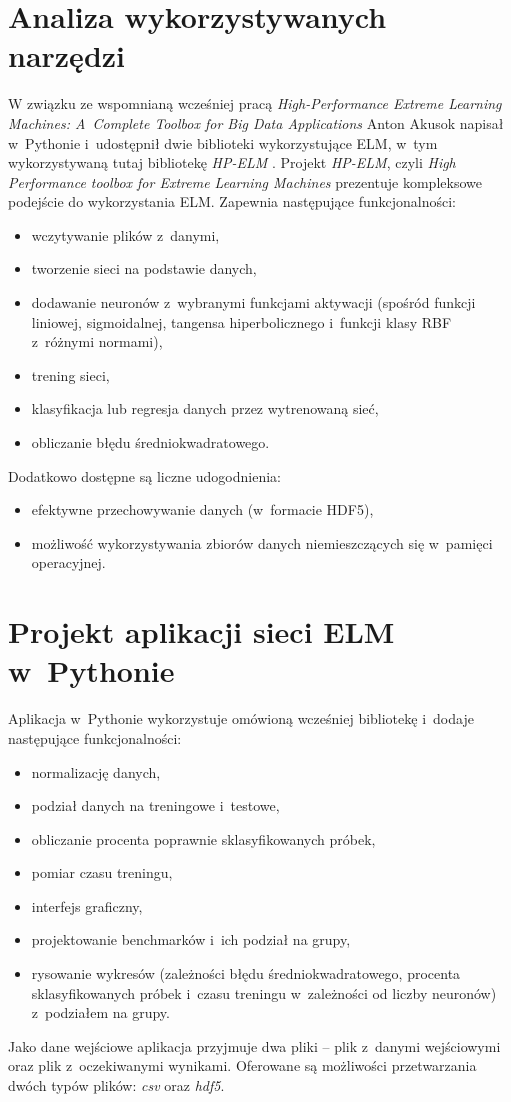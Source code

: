 \documentclass[pl]{minipw} %
\begin{document}
\section{Analiza wykorzystywanych narzędzi}
W związku ze wspomnianą wcześniej pracą \textit{High-Performance Extreme Learning Machines: A~Complete Toolbox for Big Data Applications} Anton Akusok napisał w~Pythonie i~udostępnił dwie biblioteki wykorzystujące ELM, w~tym wykorzystywaną tutaj bibliotekę \textit{HP-ELM} \cite{hpelm}.
\label{analiza-narzedzi}
Projekt \textit{HP-ELM}, czyli \textit{High Performance toolbox for Extreme Learning Machines} prezentuje kompleksowe podejście do wykorzystania ELM. Zapewnia następujące funkcjonalności:
\begin{itemize}
\item wczytywanie plików z~danymi,
\item tworzenie sieci na podstawie danych,
\item dodawanie neuronów z~wybranymi funkcjami aktywacji (spośród funkcji liniowej, sigmoidalnej, tangensa hiperbolicznego i~funkcji klasy RBF z~różnymi normami),
\item trening sieci,
\item klasyfikacja lub regresja danych przez wytrenowaną sieć,
\item obliczanie błędu średniokwadratowego.
\end{itemize}
Dodatkowo dostępne są liczne udogodnienia:
\begin{itemize}
\item efektywne przechowywanie danych (w~formacie HDF5),
\item możliwość wykorzystywania zbiorów danych niemieszczących się w~pamięci operacyjnej.
\end{itemize}
\section{Projekt aplikacji sieci ELM w~Pythonie}
Aplikacja w~Pythonie wykorzystuje omówioną wcześniej bibliotekę i~dodaje następujące funkcjonalności:
\begin{itemize}
\item normalizację danych,
\item podział danych na treningowe i~testowe,
\item obliczanie procenta poprawnie sklasyfikowanych próbek,
\item pomiar czasu treningu,
\item interfejs graficzny,
\item projektowanie benchmarków i~ich podział na grupy,
\item rysowanie wykresów (zależności błędu średniokwadratowego, procenta sklasyfikowanych próbek i~czasu treningu w~zależności od liczby neuronów) z~podziałem na grupy.
\end{itemize}
\label{python-aplikacja}
Jako dane wejściowe aplikacja przyjmuje dwa pliki -- plik z~danymi wejściowymi oraz plik z~oczekiwanymi wynikami. Oferowane są możliwości przetwarzania dwóch typów plików: \textit{csv} oraz \textit{hdf5}. 
\end{document}
